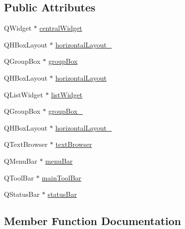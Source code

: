 \subsection*{Public Attributes}
\begin{DoxyCompactItemize}
\item 
Q\+Widget $\ast$ \hyperlink{class_ui___main_window_a30075506c2116c3ed4ff25e07ae75f81}{central\+Widget}
\item 
Q\+H\+Box\+Layout $\ast$ \hyperlink{class_ui___main_window_a03ce63974cc69b067c91bbf285cceca8}{horizontal\+Layout\+\_}
\item 
Q\+Group\+Box $\ast$ \hyperlink{class_ui___main_window_aef7cb3be8cecfc9aaf98f036a98781ce}{group\+Box}
\item 
Q\+H\+Box\+Layout $\ast$ \hyperlink{class_ui___main_window_acd6fdc9ebacc4b25b834162380d75ce8}{horizontal\+Layout}
\item 
Q\+List\+Widget $\ast$ \hyperlink{class_ui___main_window_ae647a15635ba8a0e5d5aec475db99d8f}{list\+Widget}
\item 
Q\+Group\+Box $\ast$ \hyperlink{class_ui___main_window_abb28acde35ffce4d0e6152579df2cbc3}{group\+Box\+\_}
\item 
Q\+H\+Box\+Layout $\ast$ \hyperlink{class_ui___main_window_a80867018070156432923d0266cc9fe25}{horizontal\+Layout\+\_}
\item 
Q\+Text\+Browser $\ast$ \hyperlink{class_ui___main_window_a2c789c07fa5fc1cee05aae8df52bb02d}{text\+Browser}
\item 
Q\+Menu\+Bar $\ast$ \hyperlink{class_ui___main_window_a2be1c24ec9adfca18e1dcc951931457f}{menu\+Bar}
\item 
Q\+Tool\+Bar $\ast$ \hyperlink{class_ui___main_window_a5172877001c8c7b4e0f6de50421867d1}{main\+Tool\+Bar}
\item 
Q\+Status\+Bar $\ast$ \hyperlink{class_ui___main_window_a50fa481337604bcc8bf68de18ab16ecd}{status\+Bar}
\end{DoxyCompactItemize}


\subsection{Member Function Documentation}
